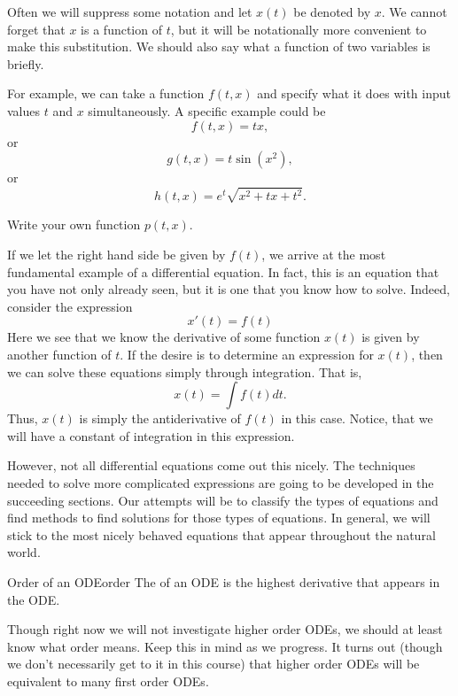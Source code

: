         \noindent Often we will suppress some notation and let $x(t)$ be denoted by $x$.  We cannot forget that $x$ is a function of $t$, but it will be notationally more convenient to make this substitution. We should also say what a function of two variables is briefly.
        
        For example, we can take a function $f(t,x)$ and specify what it does with input values $t$ and $x$ simultaneously. A specific example could be
        \[
        f(t,x)=tx,
        \]
        or
        \[
        g(t,x)= t\sin\left(x^2\right),
        \]
        or
        \[
        h(t,x)= e^{t}\sqrt{x^2+tx+t^2}.
        \]
        
        \begin{exercise}
        Write your own function $p(t,x)$.
        \end{exercise}

        If we let the right hand side be given by $f(t)$, we arrive at the most fundamental example of a differential equation. In fact, this is an equation that you have not only already seen, but it is one that you know how to solve.  Indeed, consider the expression
        \[
            x'(t) = f(t)
        \]
        Here we see that we know the derivative of some function $x(t)$ is given by another function of $t$.  If the desire is to determine an expression for $x(t)$, then we can solve these equations simply through integration. That is,
        \[
            x(t) = \int f(t) dt.
        \]
        Thus, $x(t)$ is simply the antiderivative of $f(t)$ in this case.  Notice, that we will have a constant of integration in this expression.

        However, not all differential equations come out this nicely. The techniques needed to solve more complicated expressions are going to be developed in the succeeding sections.  Our attempts will be to classify the types of equations and find methods to find solutions for those types of equations. In general, we will stick to the most nicely behaved equations that appear throughout the natural world. 

        
        \begin{df}{Order of an ODE}{order}
        The   of an ODE is the highest derivative that appears in the ODE.
        \end{df}
        
        \noindent Though right now we will not investigate higher order ODEs, we should at least know what order means.  Keep this in mind as we progress.  It turns out (though we don't necessarily get to it in this course) that higher order ODEs will be equivalent to many first order ODEs.  
        
